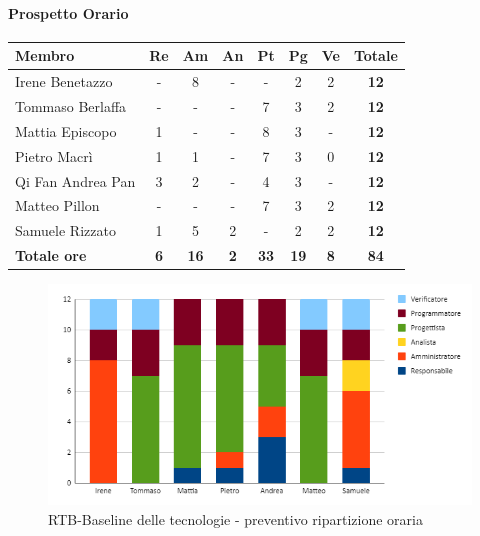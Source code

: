 \paragraph{Prospetto Orario}
\begin{center}
	\renewcommand{\arraystretch}{1.8} %
	\begin{tabular}{ |m{10em}|c|c|c|c|c|c|c| }
	\hline
	\textbf{Membro} & \textbf{Re} & \textbf{Am} &  \textbf{An} &  \textbf{Pt} &  \textbf{Pg} &  \textbf{Ve} &  \textbf{Totale}\\
    \hline
    Irene Benetazzo   & - & 8 & - & - & 2 & 2 & \textbf{12} \\
    \hline
    Tommaso Berlaffa  & - & - & - & 7 & 3 & 2 & \textbf{12} \\
    \hline
    Mattia Episcopo   & 1 & - & - & 8 & 3 & - & \textbf{12} \\
    \hline
    Pietro Macrì      & 1 & 1 & - & 7 & 3 & 0 & \textbf{12} \\
    \hline
    Qi Fan Andrea Pan & 3 & 2 & - & 4 & 3 & - & \textbf{12} \\
    \hline
    Matteo Pillon     & - & - & - & 7 & 3 & 2 & \textbf{12} \\
    \hline
    Samuele Rizzato   & 1 & 5 & 2 & - & 2 & 2 & \textbf{12} \\
    \hline
    \textbf{Totale ore} & \textbf{6} & \textbf{16} &  \textbf{2} &  \textbf{33} &  \textbf{19} &  \textbf{8} &  \textbf{84}\\
    \hline
	\end{tabular}
\end{center}
\begin{figure}[H]
    \centering\includegraphics[width=\textwidth, height=\textheight,keepaspectratio]{images/preventivo/RTB-tecnologico-ore.png}
    \caption{RTB-Baseline delle tecnologie - preventivo ripartizione oraria}
\end{figure}

